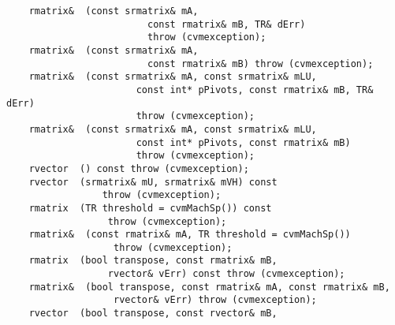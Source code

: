 \verb"    rmatrix& "\verb" (const srmatrix& mA,"\\
\verb"                         const rmatrix& mB, TR& dErr)"\\
\verb"                         throw (cvmexception);"\\
\verb"    rmatrix& "\verb" (const srmatrix& mA,"\\
\verb"                         const rmatrix& mB) throw (cvmexception);"\\
\verb"    rmatrix& "\verb" (const srmatrix& mA, const srmatrix& mLU,"\\
\verb"                       const int* pPivots, const rmatrix& mB, TR& dErr)"\\
\verb"                       throw (cvmexception);"\\
\verb"    rmatrix& "\verb" (const srmatrix& mA, const srmatrix& mLU,"\\
\verb"                       const int* pPivots, const rmatrix& mB)"\\
\verb"                       throw (cvmexception);"\\
\verb"    rvector "\verb" () const throw (cvmexception);"\\
\verb"    rvector "\verb" (srmatrix& mU, srmatrix& mVH) const"\\
\verb"                 throw (cvmexception);"\\
\verb"    rmatrix "\verb" (TR threshold = cvmMachSp()) const"\\
\verb"                  throw (cvmexception);"\\
\verb"    rmatrix& "\verb" (const rmatrix& mA, TR threshold = cvmMachSp())"\\
\verb"                   throw (cvmexception);"\\
\verb"    rmatrix "\verb" (bool transpose, const rmatrix& mB,"\\
\verb"                  rvector& vErr) const throw (cvmexception);"\\
\verb"    rmatrix& "\verb" (bool transpose, const rmatrix& mA, const rmatrix& mB,"\\
\verb"                   rvector& vErr) throw (cvmexception);"\\
\verb"    rvector "\verb" (bool transpose, const rvector& mB,"\\
